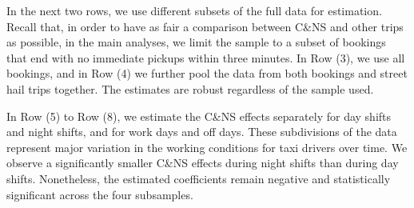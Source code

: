 \documentclass[reviewmode,AEJ]{AEA}
\begin{document}
In the next two rows, we use different subsets of the full data for estimation. Recall that, in order to have as fair a comparison between C\&NS and other trips as possible, in the main analyses, we limit the sample to a subset of bookings that end with no immediate pickups within three minutes. In Row (3), we use all bookings, and in Row (4) we further pool the data from both bookings and street hail trips together. The estimates are robust regardless of the sample used.

In Row (5) to Row (8), we  estimate the C\&NS effects separately for day shifts and night shifts, and for work days and off days. These subdivisions of the data represent major variation in the working conditions for taxi drivers over time. We observe a significantly smaller C\&NS effects during night shifts than during day shifts. Nonetheless, the estimated coefficients remain negative and statistically significant across the four subsamples.
\end{document}
